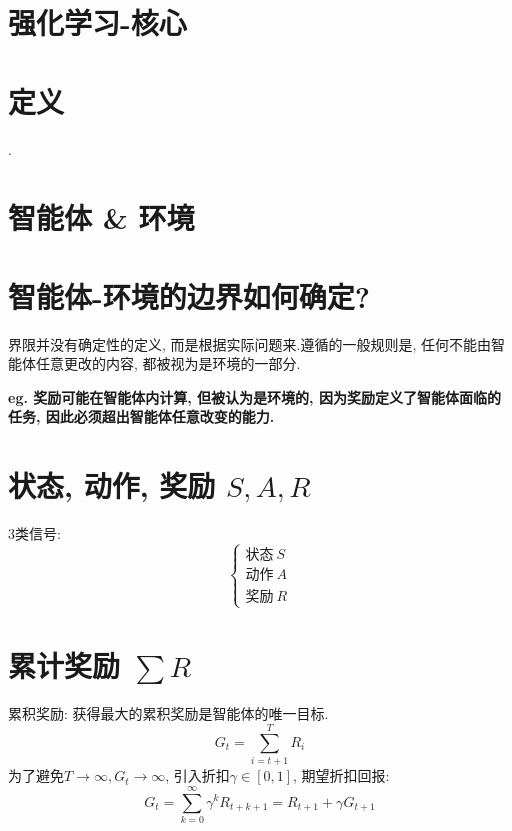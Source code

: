 \section{强化学习-核心}
    \section{定义}
        .
        
    \section{智能体 \& 环境}
        
        \section{智能体-环境的边界如何确定?}
            界限并没有确定性的定义, 而是根据实际问题来.遵循的一般规则是, 任何不能由智能体任意更改的内容, 都被视为是环境的一部分.
            
            \bf{eg.} 奖励可能在智能体内计算, 但被认为是环境的, 因为奖励定义了智能体面临的任务, 因此必须超出智能体任意改变的能力.


    \section{状态, 动作, 奖励 $S, A, R$}
    3类信号:
        \begin{displaymath} \left\{ \begin{array}{l}
            \text{状态}\ S\\
            \text{动作}\ A\\
            \text{奖励}\ R
        \end{array} \right. \end{displaymath}
        
        \section{累计奖励 $\sum R$}
            累积奖励: 获得最大的累积奖励是智能体的唯一目标.
                $$G_t= \sum_{i = t+1}^{T} R_i$$
            为了避免$T \to \infty, G_t \to \infty$, 引入折扣$\gamma \in [0,1]$, 期望折扣回报:
                $$G_t = \sum_{k=0}^\infty \gamma^k R_{t+k+1} = R_{t+1} + \gamma G_{t+1}$$
        
